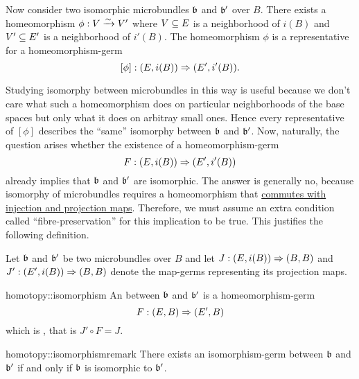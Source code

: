 \begin{myparagraph}
    Now consider two isomorphic microbundles $\mathfrak{b}$ and $\mathfrak{b}'$ over $B$.
    There exists a homeomorphism $\phi: V \xrightarrow{\sim} V'$ where $V \subseteq{} E$ is a neighborhood of $i(B)$ and $V' \subseteq{} E'$ is a neighborhood of $i'(B)$.
    The homeomorphism $\phi$ is a representative for a homeomorphism-germ
    \[ [\phi]: (E, i(B)) \Rightarrow{} (E', i'(B)). \]

    Studying isomorphy between microbundles in this way is useful because we don't care what such a
    homeomorphism does on particular neighborhoods of the base spaces but only what it does on arbitray small ones.
    Hence every representative of $[\phi]$ describes the ``same'' isomorphy between $\mathfrak{b}$ and $\mathfrak{b}'$.
    Now, naturally, the question arises whether the existence of a homeomorphism-germ
    \[ F: (E, i(B)) \Rightarrow{} (E', i'(B)) \]
    already implies that $\mathfrak{b}$ and $\mathfrak{b}'$ are isomorphic.
    The answer is generally no, because isomorphy of microbundles requires 
    a homeomorphism that \ul{commutes with injection and projection maps}.
    Therefore, we must assume an extra condition called ``fibre-preservation'' for this implication to be true.
    This justifies the following definition.
    
    Let $\mathfrak{b}$ and $\mathfrak{b}'$ be two microbundles over $B$ and
    let $J: (E, i(B)) \Rightarrow{} (B, B)$ and $J': (E', i(B)) \Rightarrow{} (B, B)$ denote the map-germs representing its projection maps.
\end{myparagraph}

\begin{mydefinition}{homotopy::isomorphism}
    An  between $\mathfrak{b}$ and $\mathfrak{b}'$ is a homeomorphism-germ 
    \[ F: (E, B) \Rightarrow{} (E', B) \]
    which is , that is $J' \circ F = J$.
\end{mydefinition}

\begin{myremark}{homotopy::isomorphismremark}
    There exists an isomorphism-germ between $\mathfrak{b}$ and $\mathfrak{b}'$ if and only if $\mathfrak{b}$ is isomorphic to $\mathfrak{b}'$.
\end{myremark}